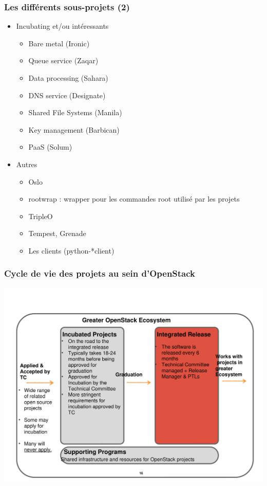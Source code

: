   \begin{frame}
    \frametitle{Les différents sous-projets (2)}
    \begin{itemize}
      \item Incubating et/ou intéressants
      \begin{itemize}
        \item Bare metal (Ironic)
        \item Queue service (Zaqar)
        \item Data processing (Sahara)
        \item DNS service (Designate)
        \item Shared File Systems (Manila)
        \item Key management (Barbican)
        \item PaaS (Solum)
      \end{itemize}\pause
      \item Autres
      \begin{itemize}
        \item Oslo
        \item rootwrap : wrapper pour les commandes root utilisé par les projets
        \item TripleO
        \item Tempest, Grenade
        \item Les clients (python-*client)
      \end{itemize}
    \end{itemize}
  \end{frame}

  \begin{frame}
    \frametitle{Cycle de vie des projets au sein d'OpenStack}
    \includegraphics[width=\textwidth]{images/innovation1.pdf}
  \end{frame}

